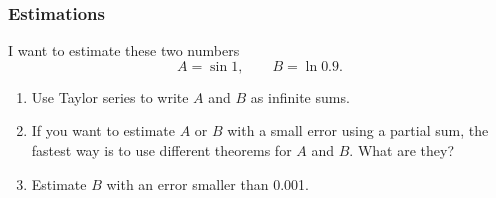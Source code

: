 \documentclass[14pt]{beamer}
\begin{document}
	\begin{frame}[t]
		\frametitle{Estimations}

		I want to estimate these two numbers
		\[
			A = \sin 1, \quad \quad B = \ln 0.9.
		\]

		\begin{enumerate}
			\item Use Taylor series to write $A$ and $B$ as infinite sums.
				\vspace{.5cm}

			\item If you want to estimate $A$ or $B$ with a small error using a partial
				sum, the fastest way is to use different theorems for $A$ and $B$. What are
				they?
				\vspace{.5cm}

			\item Estimate $B$ with an error smaller than 0.001.
		\end{enumerate}
	\end{frame}


\end{document}

